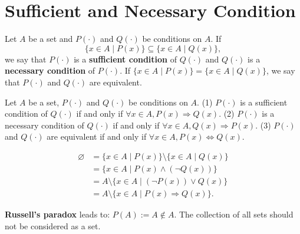 \section{Sufficient and Necessary Condition}
\begin{definitionenv}
    Let $A$ be a set and $P(\cdot)$ and $Q(\cdot)$ be conditions on $A$.
    If $$\{x\in A\mid P(x)\}\subseteq\{x\in A\mid Q(x)\}, $$ we say that $P(\cdot)$ is a \textbf{sufficient condition} of $Q(\cdot)$ and $Q(\cdot)$ is a \textbf{necessary condition} of $P(\cdot)$. 
    If $\{x\in A\mid P(x)\}=\{x\in A\mid Q(x)\}$, we say that $P(\cdot)$ and $Q(\cdot)$ are equivalent.
\end{definitionenv}
\begin{propositionenv}
    Let $A$ be a set, $P(\cdot)$ and $Q(\cdot)$ be conditions on $A$.
    \newline
    (1) $P(\cdot)$ is a sufficient condition of $Q(\cdot)$ if and only if $\forall x\in A, P(x)\Rightarrow Q(x)$.
    \newline
    (2) $P(\cdot) $ is a necessary condition of $Q(\cdot)$ if and only if $\forall x\in A, Q(x)\Rightarrow P(x)$.
    \newline
    (3) $P(\cdot)$ and $Q(\cdot)$ are equivalent if and only if $\forall x\in A, P(x)\Leftrightarrow Q(x)$.
\end{propositionenv}
\begin{proofenv}
\begin{align*}
    \varnothing&=\{x\in A\mid P(x)\} \setminus \{x\in A\mid Q(x)\}\\
    &=\{x\in A\mid P(x)\wedge (\neg Q(x))\}\\
    &=A\setminus\{x\in A\mid (\neg P(x))\vee  Q(x)\}\\
    &=A\setminus\{x\in A \mid P(x)\Rightarrow Q(x)\}.
\end{align*}
\end{proofenv}
\begin{box2}
\textbf{Russell's paradox} leads to: $P(A):=A\notin A$. The collection of all sets should not be considered as a set.
\end{box2}



